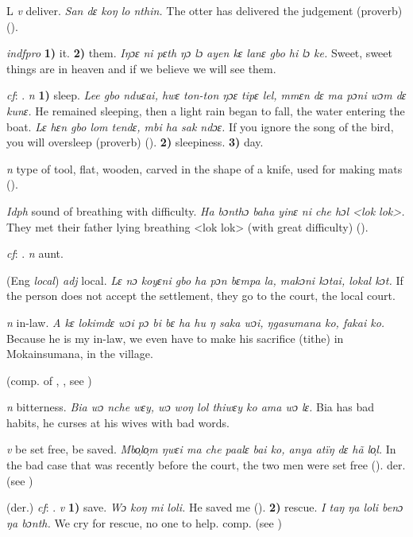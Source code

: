 \begin{letter}{L}
 \textit{v} deliver. \textit{San dɛ koŋ lo nthin.} The otter has delivered the judgement (proverb) (\citealt{Pichl1967}). 

 \textit{indfpro} \textbf{1)} it. \textbf{2)} them. \textit{Iŋɔɛ ni pɛth ŋɔ lɔ ayen kɛ lanɛ gbo hi lɔ ke.} Sweet, sweet things are in heaven and if we believe we will see them.

 \textit{cf}: . \textit{n} \textbf{1)} sleep. \textit{Lee gbo nduɛai, hwɛ ton-ton ŋɔɛ tipɛ lel, mmɛn dɛ ma pɔni wɔm dɛ kunɛ.} He remained sleeping, then a light rain began to fall, the water entering the boat. \textit{Lɛ hɛn gbo lom tendɛ, mbi ha sak ndɔɛ.} If you ignore the song of the bird, you will oversleep (proverb) (\citealt{TISLL1979}). \textbf{2)} sleepiness. \textbf{3)} day.

 \textit{n} type of tool, flat, wooden, carved in the shape of a knife, used for making mats (\citealt{Pichl1967}). 

 \textit{Idph} sound of breathing with difficulty. \textit{Ha bɔnthɔ baha yinɛ ni che hɔl <lok lok>.} They met their father lying breathing <lok lok> (with great difficulty) (\citealt[txt28]{Sumner1921}). 

 \textit{cf}: . \textit{n} aunt.

 (Eng \textit{local}) \textit{adj} local. \textit{Lɛ nɔ koyɛni gbo ha pɔn bɛmpa la, makɔni kɔtai, lokal kɔt.} If the person does not accept the settlement, they go to the court, the local court.

 \textit{n} in-law. \textit{A kɛ lokimdɛ wɔi pɔ bi bɛ ha hu ŋ saka wɔi, ŋgasumana ko, fakai ko.} Because he is my in-law, we even have to make his sacrifice (tithe) in Mokainsumana, in the village.

 (comp. of , , see ) 

 \textit{n} bitterness. \textit{Bia wɔ nche wɛy, wɔ woŋ lol thiwɛy ko ama wɔ lɛ.} Bia has bad habits, he curses at his wives with bad words. 

 \textit{v} be set free, be saved. \textit{Mbo̹lo̹m ŋwɛi ma che paalɛ bai ko, anya atïŋ dɛ hã lo̹l.} In the bad case that was recently before the court, the two men were set free (\citealt{Pichl1967}). der.  (see ) 

 (der.) \textit{cf}: . \textit{v} \textbf{1)} save. \textit{Wɔ koŋ mi loli.} He saved me (\citealt{Pichl1967}). \textbf{2)} rescue. \textit{I taŋ ŋa loli benɔ ŋa bɔnth.} We cry for rescue, no one to help. comp.  (see ) 


\end{letter}
